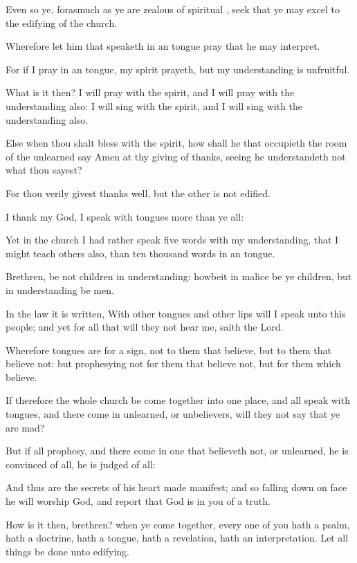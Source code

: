 {Even
so
ye, forasmuch
as ye
are
zealous of
spiritual
{},
seek
that ye may
excel
to the
edifying of the
church.

Wherefore let
him that
speaketh in
an
{}
tongue
pray
that he may
interpret.

For
if I
pray in
an
{}
tongue,
my
spirit
prayeth,
but
my
understanding
is
unfruitful.

What is
it
then? I will
pray with the
spirit,
and I will
pray with the
understanding
also: I will
sing with the
spirit,
and I will
sing with the
understanding
also.

Else
when thou shalt
bless with the
spirit,
how
shall he
that
occupieth the
room of the
unlearned
say
Amen
at
thy giving of
thanks,
seeing he
understandeth
not
what thou
sayest?

For
thou
verily givest
thanks
well,
but the
other
is
not
edified.

I
thank
my
God, I
speak with
tongues more
than
ye
all:

Yet
in the
church I had
rather
speak
five
words
with
my
understanding,
that
{} I might
teach
others
also,
than ten
thousand
words
in
an
{}
tongue.

Brethren,
be
not
children in
understanding:
howbeit in
malice be ye
children,
but in
understanding
be
men.

In the
law it is
written,
With
{} other
tongues
and
other
lips will I
speak unto
this
people;
and yet for all
that will
they
not
hear
me,
saith the
Lord.

Wherefore
tongues
are
for a
sign,
not to
them that
believe,
but to
them that believe
not:
but
prophesying
{}
not for
them that believe
not,
but for
them which
believe.

If
therefore the
whole
church be come
together
into one
place,
and
all
speak with
tongues,
and there come
in
{}
unlearned,
or
unbelievers, will
they
not
say
that ye are
mad?

But
if
all
prophesy,
and there come
in
one that believeth
not,
or
{}
unlearned, he is
convinced
of
all, he is
judged
of
all:

And
thus
are the
secrets of
his
heart
made
manifest;
and
so falling
down
on
{}
face he will
worship
God, and
report
that
God
is
in
you of a
truth.

How is
it
then,
brethren?
when ye come
together, every
one of
you
hath a
psalm,
hath a
doctrine,
hath a
tongue,
hath a
revelation,
hath an
interpretation.
Let all
things be
done
unto
edifying.

}
